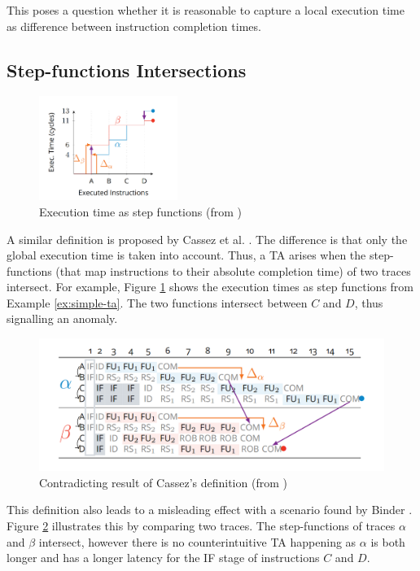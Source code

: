 This poses a question whether it is reasonable to capture a local execution time as difference between instruction completion times. 

\subsection{Step-functions Intersections}

\begin{figure}[H]
    \centering
    \includegraphics[width=0.4\textwidth]{figures/step-functions.png}
    \caption{Execution time as step functions (from \cite{binder_definitions_2022})}
    \label{fig:exec-time-step-fun}
\end{figure}

A similar definition is proposed by Cassez et al. \cite{cassez_what_2012}. The difference is that only the global execution time is taken into account. Thus, a TA arises when the step-functions (that map instructions to their absolute completion time) of two traces intersect. For example, Figure \ref{fig:exec-time-step-fun} shows the execution times as step functions from Example \ref{ex:simple-ta}. The two functions intersect between $C$ and $D$, thus signalling an anomaly.


\begin{figure}[!htb]
    \centering
    \includegraphics[width=\textwidth]{figures/step-func-2-bad.png}
    \caption{Contradicting result of Cassez's definition (from \cite{binder_definitions_2022})}
    \label{fig:step-2}
\end{figure}

This definition also leads to a misleading effect with a scenario found by Binder \cite{binder_definitions_2022}. Figure \ref{fig:step-2} illustrates this by comparing two traces. The step-functions of traces $\alpha$ and $\beta$ intersect, however there is no counterintuitive TA happening as $\alpha$ is both longer and has a longer latency for the IF stage of instructions $C$ and $D$.

